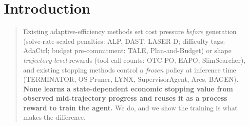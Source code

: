 %
\section{Introduction}
\label{sec:introduction}



\begin{quote}
Existing adaptive-efficiency methods set cost pressure \emph{before} generation
(solve-rate-scaled penalties: ALP, DAST, LASER-D; difficulty tags: AdaCtrl;
budget pre-commitment: TALE, Plan-and-Budget) or shape \emph{trajectory-level}
rewards (tool-call counts: OTC-PO, EAPO, SlimSearcher), and existing stopping
methods control a \emph{frozen} policy at inference time (TERMINATOR, OS-Pruner,
LYNX, SupervisorAgent, Ares, BAGEN). \textbf{None learns a state-dependent
economic stopping value from observed mid-trajectory progress and reuses it as a
process reward to train the agent.} We do, and we show the training is what makes
the difference.
\end{quote}

